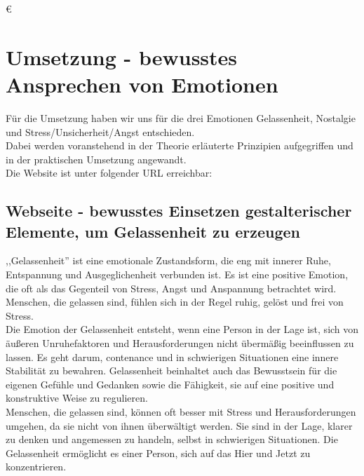 €\documentclass[./dokumentation.tex]{subfiles}
\begin{document}
\chapter{Umsetzung - bewusstes Ansprechen von Emotionen}
Für die Umsetzung haben wir uns für die drei Emotionen Gelassenheit, Nostalgie und Stress/Unsicherheit/Angst entschieden.\\ 
Dabei werden voranstehend in der Theorie erläuterte Prinzipien aufgegriffen und in der praktischen Umsetzung angewandt.\\
Die Website ist unter folgender URL erreichbar:

\section{Webseite - bewusstes Einsetzen gestalterischer Elemente, um Gelassenheit zu erzeugen}
,,Gelassenheit'' ist eine emotionale Zustandsform, die eng mit innerer Ruhe, Entspannung und Ausgeglichenheit verbunden ist. Es ist eine positive Emotion, die oft als das Gegenteil von Stress, Angst und Anspannung betrachtet wird. Menschen, die gelassen sind, fühlen sich in der Regel ruhig, gelöst und frei von Stress. \\
Die Emotion der Gelassenheit entsteht, wenn eine Person in der Lage ist, sich von äußeren Unruhefaktoren und Herausforderungen nicht übermäßig beeinflussen zu lassen. Es geht darum, contenance und in schwierigen Situationen eine innere Stabilität zu bewahren. Gelassenheit beinhaltet auch das Bewusstsein für die eigenen Gefühle und Gedanken sowie die Fähigkeit, sie auf eine positive und konstruktive Weise zu regulieren. \\
Menschen, die gelassen sind, können oft besser mit Stress und Herausforderungen umgehen, da sie nicht von ihnen überwältigt werden. Sie sind in der Lage, klarer zu denken und angemessen zu handeln, selbst in schwierigen Situationen. Die Gelassenheit ermöglicht es einer Person, sich auf das Hier und Jetzt zu konzentrieren.\\
\end{document}
